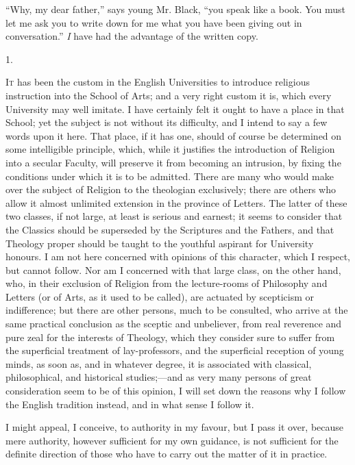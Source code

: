 ``Why, my dear father,'' says young Mr. Black, ``you
speak like a book. You must let me ask you to write down for me what
you have been giving out in conversation.''
\emph{I} have had the advantage of the written copy.


1.

I\textsc{t} has been the custom in the English Universities to introduce
religious instruction into the School of Arts; and a very right custom
it is, which every University may well imitate. I have certainly felt
it ought to have a place in that School; yet the subject is not
without its difficulty, and I intend to say a few words upon it here.
That place, if it has one, should of course be determined on some
intelligible principle, which, while it justifies the introduction of
Religion into a secular Faculty, will preserve it from becoming an
intrusion, by fixing the conditions under which it is to be admitted.
There are many who would make over the subject of Religion to the
theologian exclusively; there are others who allow it almost unlimited
extension in the province of Letters. The latter of these two classes,
if not large, at least is serious and earnest; it seems to consider
that the Classics should be superseded by the Scriptures and the
Fathers, and that Theology proper should be taught to the youthful
aspirant for University honours. I am not here concerned with opinions
of this character, which I respect, but cannot follow. Nor am I
concerned with that large class, on the other hand, who, in their
exclusion of Religion from the lecture-rooms of Philosophy and Letters
(or of Arts, as it used to be called), are actuated by scepticism or
indifference; but there are other persons, much to be consulted, who
arrive at the same practical conclusion as the sceptic and
unbeliever, from real reverence and pure zeal for the interests of
Theology, which they consider sure to suffer from the superficial
treatment of lay-professors, and the superficial reception of young
minds, as soon as, and in whatever degree, it is associated with
classical, philosophical, and historical studies;—and as very many
persons of great consideration seem to be of this opinion, I will set
down the reasons why I follow the English tradition instead, and in
what sense I follow it.

I might appeal, I conceive, to authority in my favour, but I pass
it over, because mere authority, however sufficient for my own
guidance, is not sufficient for the definite direction of those who
have to carry out the matter of it in practice.


